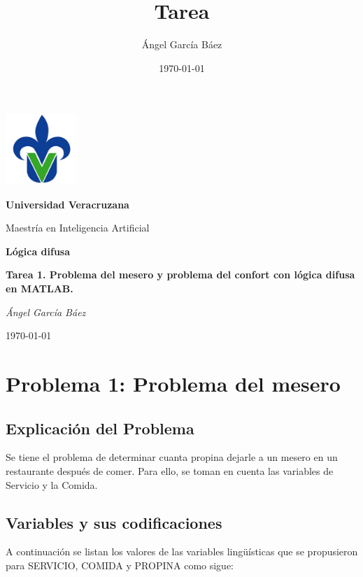 \documentclass[11pt, letterpaper]{article}
\title{\bfseries Tarea}
\author{Ángel García Báez}
\date{\today}
\begin{document}
	
	\begin{titlepage}
		\centering
		\includegraphics[width=0.2\textwidth]{logo.png}\par
		\vspace{1cm}
		{\LARGE \bfseries Universidad Veracruzana \par}
		\vspace{1cm}
		{\Large Maestría en Inteligencia Artificial\par}
		\vspace{3cm}
		{\LARGE \bfseries Lógica difusa \par}
		\vspace{1cm}
		{\Large \bfseries Tarea 1. Problema del mesero y problema del confort con lógica difusa en MATLAB. \par}
		\vfill
		{\Large \textit{Ángel García Báez}\par}
		\vfill
		{\Large \today \par}
	\end{titlepage}
	
	\newpage
	\tableofcontents
	\newpage
	
\section{Problema 1: Problema del mesero}

\subsection{Explicación del Problema}

Se tiene el problema de determinar cuanta propina dejarle a un mesero en un restaurante después de comer. Para ello, se toman en cuenta las variables de Servicio y la Comida.

\subsection{Variables y sus codificaciones}


A continuación se listan los valores de las variables lingüísticas que se propusieron para SERVICIO, COMIDA y PROPINA como sigue:
\end{document}
